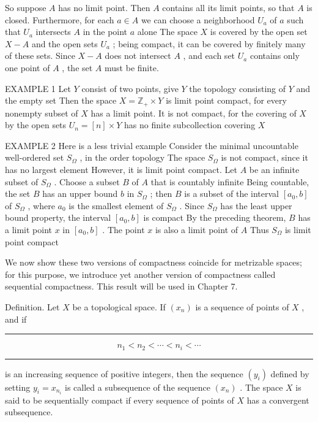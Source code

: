 \documentclass[10pt]{article}
\newcommand{\HRule}{\begin{center}\rule{0.9\linewidth}{0.2mm}\end{center}}
\begin{document}
So suppose \(A\) has no limit point. Then \(A\) contains all its limit points, so that \(A\) is closed. Furthermore, for each \(a \in  A\) we can choose a neighborhood \({U}_{a}\) of \(a\) such that \({U}_{a}\) intersects \(A\) in the point \(a\) alone The space \(X\) is covered by the open set \(X - A\) and the open sets \({U}_{a}\) ; being compact, it can be covered by finitely many of these sets. Since \(X - A\) does not intersect \(A\) , and each set \({U}_{a}\) contains only one point of \(A\) , the set \(A\) must be finite.

EXAMPLE 1 Let \(Y\) consist of two points, give \(Y\) the topology consisting of \(Y\) and the empty set Then the space \(X = {\mathbb{Z}}_{ + } \times  Y\) is limit point compact, for every nonempty subset of \(X\) has a limit point. It is not compact, for the covering of \(X\) by the open sets \({U}_{n} = \left\lbrack  n\right\rbrack   \times  Y\) has no finite subcollection covering \(X\)

EXAMPLE 2 Here is a less trivial example Consider the minimal uncountable well-ordered set \({S}_{\Omega }\) , in the order topology The space \({S}_{\Omega }\) is not compact, since it has no largest element However, it is limit point compact. Let \(A\) be an infinite subset of \({S}_{\Omega }\) . Choose a subset \(B\) of \(A\) that is countably infinite Being countable, the set \(B\) has an upper bound \(b\) in \({S}_{\Omega }\) ; then \(B\) is a subset of the interval \(\left\lbrack  {{a}_{0},b}\right\rbrack\) of \({S}_{\Omega }\) , where \({a}_{0}\) is the smallest element of \({S}_{\Omega }\) . Since \({S}_{\Omega }\) has the least upper bound property, the interval \(\left\lbrack  {{a}_{0},b}\right\rbrack\) is compact By the preceding theorem, \(B\) has a limit point \(x\) in \(\left\lbrack  {{a}_{0},b}\right\rbrack\) . The point \(x\) is also a limit point of \(A\) Thus \({S}_{\Omega }\) is limit point compact

We now show these two versions of compactness coincide for metrizable spaces; for this purpose, we introduce yet another version of compactness called sequential compactness. This result will be used in Chapter 7.

Definition. Let \(X\) be a topological space. If \(\left( {x}_{n}\right)\) is a sequence of points of \(X\) , and if

\HRule

\[
{n}_{1} < {n}_{2} < \cdots  < {n}_{i} < \cdots
\]

\HRule

is an increasing sequence of positive integers, then the sequence \(\left( {y}_{i}\right)\) defined by setting \({y}_{i} = {x}_{{n}_{i}}\) is called a subsequence of the sequence \(\left( {x}_{n}\right)\) . The space \(X\) is said to be sequentially compact if every sequence of points of \(X\) has a convergent subsequence.
\end{document}
